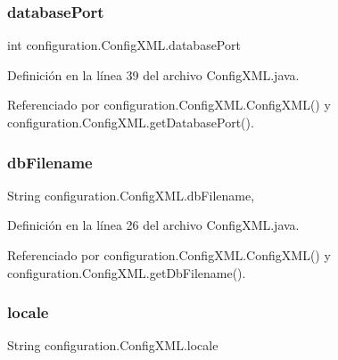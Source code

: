 \subsubsection{\texorpdfstring{databasePort}{databasePort}}
{\footnotesize\ttfamily int configuration.\+Config\+X\+M\+L.\+database\+Port\hspace{0.3cm}{\ttfamily [private]}}



Definición en la línea 39 del archivo Config\+X\+M\+L.\+java.



Referenciado por configuration.\+Config\+X\+M\+L.\+Config\+X\+M\+L() y configuration.\+Config\+X\+M\+L.\+get\+Database\+Port().

\mbox{\label{classconfiguration_1_1ConfigXML_a421b678aff5893a1927f5257b1becb14}} 
\subsubsection{\texorpdfstring{dbFilename}{dbFilename}}
{\footnotesize\ttfamily String configuration.\+Config\+X\+M\+L.\+db\+Filename\hspace{0.3cm}{\ttfamily [static]}, {\ttfamily [private]}}



Definición en la línea 26 del archivo Config\+X\+M\+L.\+java.



Referenciado por configuration.\+Config\+X\+M\+L.\+Config\+X\+M\+L() y configuration.\+Config\+X\+M\+L.\+get\+Db\+Filename().

\mbox{\label{classconfiguration_1_1ConfigXML_a34c81c18f387adacbf595cee3c0229b0}} 
\subsubsection{\texorpdfstring{locale}{locale}}
{\footnotesize\ttfamily String configuration.\+Config\+X\+M\+L.\+locale\hspace{0.3cm}{\ttfamily [private]}}



